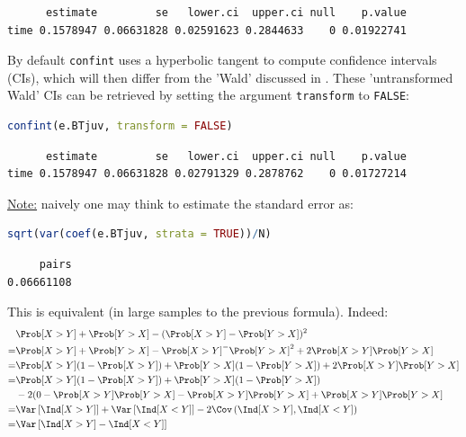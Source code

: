 \documentclass[12pt]{article}
\begin{document}
\label{}
\begin{verbatim}
      estimate         se   lower.ci  upper.ci null    p.value
time 0.1578947 0.06631828 0.02591623 0.2844633    0 0.01922741
\end{verbatim}


By default \texttt{confint} uses a hyperbolic tangent to compute confidence
intervals (CIs), which will then differ from the 'Wald' discussed in
\cite{matsouaka2022robust}. These 'untransformed Wald' CIs can be
retrieved by setting the argument \texttt{transform} to \texttt{FALSE}:
\begin{lstlisting}[language=r,numbers=none]
confint(e.BTjuv, transform = FALSE)
\end{lstlisting}

\label{}
\begin{verbatim}
      estimate         se   lower.ci  upper.ci null    p.value
time 0.1578947 0.06631828 0.02791329 0.2878762    0 0.01727214
\end{verbatim}


\clearpage

\uline{Note:} naively one may think to estimate the standard error as:
\begin{lstlisting}[language=r,numbers=none]
sqrt(var(coef(e.BTjuv, strata = TRUE))/N)
\end{lstlisting}

\label{}
\begin{verbatim}
     pairs 
0.06661108
\end{verbatim}


This is equivalent (in large samples to the previous formula). Indeed:
\begin{align*}
&\Prob[X>Y] + \Prob[Y>X] - (\Prob[X>Y] - \Prob[Y>X])^2 \\
=& \Prob[X>Y] + \Prob[Y>X] - \Prob[X>Y]^ - \Prob[Y>X]^2 + 2 \Prob[X>Y] \Prob[Y>X] \\
=& \Prob[X>Y](1-\Prob[X>Y]) + \Prob[Y>X](1-\Prob[Y>X]) + 2 \Prob[X>Y] \Prob[Y>X] \\
=& \Prob[X>Y](1-\Prob[X>Y]) + \Prob[Y>X](1-\Prob[Y>X]) \\
 & - 2 (0 - \Prob[X>Y] \Prob[Y>X] - \Prob[X>Y] \Prob[Y>X] + \Prob[X>Y] \Prob[Y>X] \\
=& \Var\left[\Ind[X>Y]\right] + \Var\left[\Ind[X<Y]\right] - 2 \Cov\left(\Ind[X>Y],\Ind[X<Y]\right) \\
=& \Var\left[\Ind[X>Y]-\Ind[X<Y]\right] \\
\end{align*}
\end{document}
